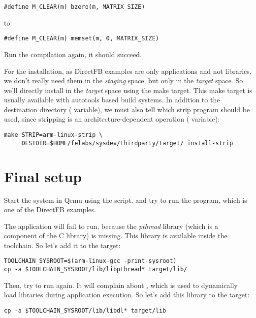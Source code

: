 \begin{verbatim}
#define M_CLEAR(m) bzero(m, MATRIX_SIZE)
\end{verbatim}

to

\begin{verbatim}
#define M_CLEAR(m) memset(m, 0, MATRIX_SIZE)
\end{verbatim}

Run the compilation again, it should succeed.

For the installation, as DirectFB examples are only applications and
not libraries, we don't really need them in the {\em staging} space,
but only in the {\em target} space. So we'll directly install in the
{\em target} space using the  make target. This
make target is usually available with autotools based build
systems. In addition to the destination directory (
variable), we must also tell which strip program should be used, since
stripping is an architecture-dependent operation (
variable):

\begin{verbatim}
make STRIP=arm-linux-strip \
     DESTDIR=$HOME/felabs/sysdev/thirdparty/target/ install-strip
\end{verbatim}

\section{Final setup}

Start the system in Qemu using the  script, and try to
run the \code{df_andi} program, which is one of the DirectFB examples.

The application will fail to run, because the {\em pthread} library
(which is a component of the C library) is missing. This library is
available inside the toolchain. So let's add it to the target:

\begin{verbatim}
TOOLCHAIN_SYSROOT=$(arm-linux-gcc -print-sysroot)
cp -a $TOOLCHAIN_SYSROOT/lib/libpthread* target/lib/
\end{verbatim}

Then, try to run  again. It will complain about
, which is used to dynamically load libraries during
application execution. So let's add this library to the target:

\begin{verbatim}
cp -a $TOOLCHAIN_SYSROOT/lib/libdl* target/lib
\end{verbatim}


